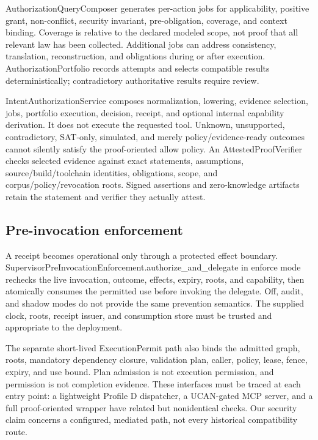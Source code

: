 \documentclass{article}
\begin{document}
AuthorizationQueryComposer generates per-action jobs for applicability, positive grant, non-conflict, security invariant, pre-obligation, coverage, and context binding. Coverage is relative to the declared modeled scope, not proof that all relevant law has been collected. Additional jobs can address consistency, translation, reconstruction, and obligations during or after execution. AuthorizationPortfolio records attempts and selects compatible results deterministically; contradictory authoritative results require review.

IntentAuthorizationService composes normalization, lowering, evidence selection, jobs, portfolio execution, decision, receipt, and optional internal capability derivation. It does not execute the requested tool. Unknown, unsupported, contradictory, SAT-only, simulated, and merely policy/evidence-ready outcomes cannot silently satisfy the proof-oriented allow policy. An AttestedProofVerifier checks selected evidence against exact statements, assumptions, source/build/toolchain identities, obligations, scope, and corpus/policy/revocation roots. Signed assertions and zero-knowledge artifacts retain the statement and verifier they actually attest.

\subsection{Pre-invocation enforcement}

A receipt becomes operational only through a protected effect boundary. SupervisorPreInvocationEnforcement.authorize\_\allowbreak{}and\_\allowbreak{}delegate in enforce mode rechecks the live invocation, outcome, effects, expiry, roots, and capability, then atomically consumes the permitted use before invoking the delegate. Off, audit, and shadow modes do not provide the same prevention semantics. The supplied clock, roots, receipt issuer, and consumption store must be trusted and appropriate to the deployment.

The separate short-lived ExecutionPermit path also binds the admitted graph, roots, mandatory dependency closure, validation plan, caller, policy, lease, fence, expiry, and use bound. Plan admission is not execution permission, and permission is not completion evidence. These interfaces must be traced at each entry point: a lightweight Profile D dispatcher, a UCAN-gated MCP server, and a full proof-oriented wrapper have related but nonidentical checks. Our security claim concerns a configured, mediated path, not every historical compatibility route.
\end{document}
